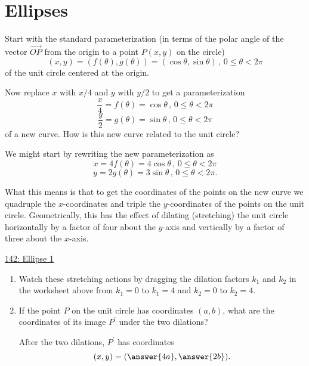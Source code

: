 \documentclass{ximera}
\begin{document}
\section{Ellipses}
\begin{example} \label{Ex:DFDrefdfobbzx}
Start with the standard parameterization (in terms of the polar angle of the vector $\overrightarrow{OP}$ from the origin to a point $P(x,y)$ on the circle)
\[
    (x,y) = (f(\theta) , g(\theta)) =   ( \cos \theta , \sin \theta ) \, , \, 0\leq\theta < 2\pi 
\]
of the unit circle centered at the origin.

Now replace $x$ with $x/4$ and $y$ with $y/2$ to get a parameterization
\[
  \frac{x}{4} = f(\theta) = \cos\theta \, , \, 0\leq\theta < 2\pi 
\]
\[
  \frac{y}{2} = g(\theta) = \sin \theta \, , \, 0\leq\theta < 2\pi 
\]
of a new curve. How is this new curve related to the unit circle?

We might start by rewriting the new parameterization as
\[
      x = 4 f(\theta) = 4\cos\theta \, , \, 0\leq\theta < 2\pi 
\]
\[ 
   y = 2 g(\theta) = 3\sin \theta \, , \, 0\leq\theta < 2\pi .
\]

What this means is that to get the coordinates of the points on the new curve we quadruple the $x$-coordinates and triple the $y$-coordinates of the points on the unit circle. Geometrically, this has the effect of dilating (stretching) the unit circle horizontally by a factor of four about the $y$-axis and vertically by a factor of three about the $x$-axis. 


\begin{onlineOnly}
    \begin{center}
\end{center}
\end{onlineOnly}

\href{https://www.desmos.com/calculator/3ibj708prx}{142: Ellipse 1}

\begin{enumerate}
\item Watch these stretching actions by dragging the dilation factors $k_1$ and $k_2$ in the worksheet above from $k_1=0$ to $k_1=4$ and $k_2=0$ to $k_2 = 4$.

\item If the point $P$ on the unit circle has coordinates $(a,b)$, what are the coordinates of its image $P^\prime$ under the two dilations?

After the two dilations, $P^\prime$ has coordinates
\[
    (x,y) = (  \answer{4a} , \answer{2b} ) .
\]
\end{enumerate}




\end{example}
\end{document}

